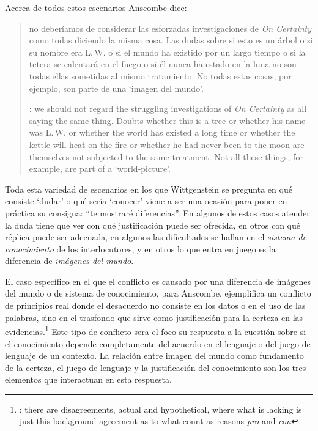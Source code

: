       Acerca de todos estos escenarios Anscombe dice: \blockquote[{\cite[130]{anscombe1981parmenides:qli}}: we should not regard the struggling investigations of \emph{On Certainty} as all saying the same thing. Doubts whether this is a tree or whether his name was L.\,W. or whether the world has existed a long time or whether the kettle will heat on the fire or whether he had never been to the moon are themselves not subjected to the same treatment. Not all these things, for example, are part of a `world-picture'.]{no deberíamos de considerar las esforzadas investigaciones de \emph{On Certainty} como todas diciendo la misma cosa. Las dudas sobre si esto es un árbol o si su nombre era L.\,W. o si el mundo ha existido por un largo tiempo o si la tetera se calentará en el fuego o si él nunca ha estado en la luna no son todas ellas sometidas al mismo tratamiento. No todas estas cosas, por ejemplo, son parte de una `imagen del mundo'.} Toda esta variedad de escenarios en los que Wittgenstein se pregunta en qué consiste `dudar' o qué sería `conocer' viene a ser una ocasión para poner en práctica su consigna: ``te mostraré diferencias''. En algunos de estos casos atender la duda tiene que ver con qué justificación puede ser ofrecida, en otros con qué réplica puede ser adecuada, en algunos las dificultades se hallan en el \emph{sistema de conocimiento} de los interlocutores, y en otros lo que entra en juego es la diferencia de \emph{imágenes del mundo}.

      El caso específico en el que el conflicto es causado por una diferencia de imágenes del mundo o de sistema de conocimiento, para Anscombe, ejemplifica un conflicto de principios real donde el desacuerdo no consiste en los datos o en el uso de las palabras, sino en el trasfondo que sirve como justificación para la certeza en las evidencias.\footnote{\cite[Cf.~][222]{teichmann2008ans}: there are disagreements, actual and hypothetical, where what is lacking is just this background agreement as to what count as reasons \emph{pro} and \emph{con}} Este tipo de conflicto sera el foco su respuesta a la cuestión sobre si el conocimiento depende completamente del acuerdo en el lenguaje o del juego de lenguaje de un contexto. La relación entre imagen del mundo como fundamento de la certeza, el juego de lenguaje y la justificación del conocimiento son los tres elementos que interactuan en esta respuesta.

